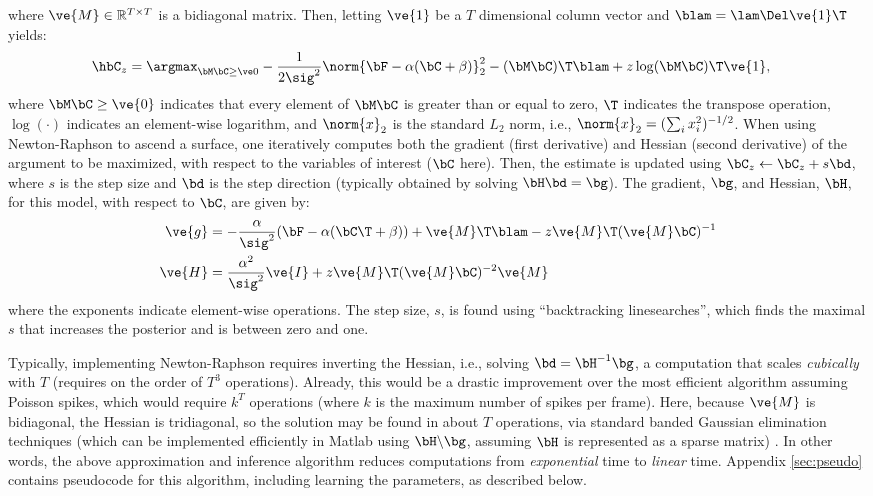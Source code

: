 \noindent where $\ve{M} \in \mathbb{R}^{T \times T}$ is a bidiagonal matrix.  Then, letting $\ve{1}$ be a $T$ dimensional column vector and $\blam=\lam \Del \ve{1}\T$ yields: 
\begin{align} 
\hbC_{\zzz} 
&= \az  -\frac{1}{2 \sig^2} \norm{\bF - \alpha (\bC +\beta)}_2^2 - (\bM \bC )\T \blam  + \zzz \log(\bM \bC)\T\ve{1},  \label{eq:eta3}
\end{align}
\noindent where $\bM \bC \geq \ve{0}$ indicates that every element of $\bM \bC$ is greater than or equal to zero, $\T$ indicates the transpose operation, $\log(\cdot)$ indicates an element-wise logarithm, and $\norm{x}_2$ is the standard $L_2$ norm, i.e., $\norm{x}_2=(\sum_i x_i^2)^{-1/2}$. When using Newton-Raphson to ascend a surface, one iteratively computes both the gradient (first derivative) and Hessian (second derivative) of the argument to be maximized, with respect to the variables of interest ($\bC$ here).  Then, the estimate is updated using $\bC_z \leftarrow \bC_z + s \bd$, where $s$ is the step size and $\bd$ is the step direction (typically obtained by solving $\bH \bd = \bg$).  The gradient, $\bg$, and Hessian, $\bH$, for this model, with respect to $\bC$, are given by:
\begin{subequations} \label{eq:NR}
\begin{align}
\ve{g} &= -\frac{\alpha}{\sig^2}(\bF -\alpha({\bC\T} + \beta)) + \ve{M}\T\blam - \zzz \ve{M}\T (\ve{M} \bC)^{-1} \label{eq:g} \\
\ve{H} &= \frac{\alpha^2}{\sig^2} \ve{I} + \zzz \ve{M}\T (\ve{M} \bC)^{-2} \ve{M} \label{eq:H}
\end{align}
\end{subequations}
\noindent where the exponents indicate element-wise operations. The step size, $s$, is found using ``backtracking linesearches'', which finds the maximal $s$ that increases the posterior and is between zero and one.

Typically, implementing Newton-Raphson requires inverting the Hessian, i.e.,  solving $\bd = \bH^{-1} \bg$, a computation that scales \emph{cubically} with $T$ (requires on the order of $T^3$ operations). Already, this would be a drastic improvement over the most efficient algorithm assuming Poisson spikes, which would require $k^T$ operations (where $k$ is the maximum number of spikes per frame).  Here, because $\ve{M}$ is bidiagonal, the Hessian is tridiagonal, so the solution may be found in about $T$ operations, via standard banded Gaussian elimination techniques (which can be implemented efficiently in Matlab using $\bH \backslash \bg$, assuming $\bH$ is represented as a sparse matrix) \cite{PaninskiWu09}. In other words, the above approximation and inference algorithm reduces computations from \emph{exponential} time to \emph{linear} time.  Appendix \ref{sec:pseudo} contains pseudocode for this algorithm, including learning the parameters, as described below.





